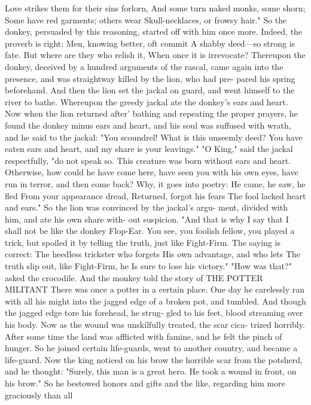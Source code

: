 \documentclass{book}
\begin{document}
Love strikes them for their sins forlorn,
And some turn naked monks, some shorn;
Some have red garments; others wear
Skull-necklaces, or frowsy hair."
So the donkey, persuaded by this reasoning,
started off with him once more. Indeed, the proverb
is right:
Men, knowing better, oft commit
A shabby deed---so strong is fate.
But where are they who relish it,
When once it is irrevocate?
Thereupon the donkey, deceived by a hundred
arguments of the rascal, came again into the presence,
and was straightway killed by the lion, who had pre-
pared his spring beforehand. And then the lion set
the jackal on guard, and went himself to the river to
bathe. Whereupon the greedy jackal ate the donkey's
ears and heart. Now when the lion returned after'
bathing and repeating the proper prayers, he found
the donkey minus ears and heart, and his soul was
suffused with wrath, and he said to the jackal: "You
scoundrel! What is this unseemly deed? You have
eaten ears and heart, and my share is your leavings."
"O King," said the jackal respectfully, "do not
speak so. This creature was born without ears and
heart. Otherwise, how could he have come here, have
seen you with his own eyes, have run in terror, and
then come back? Why, it goes into poetry:
He came, he saw, he fled
From your appearance dread,
Returned, forgot his fears
The fool lacked heart and ears."
So the lion was convinced by the jackal's argu-
ment, divided with him, and ate his own share with-
out suspicion.
"And that is why I say that I shall not be like the
donkey Flop-Ear. You see, you foolish fellow, you
played a trick, but spoiled it by telling the truth,
just like Fight-Firm. The saying is correct:
The heedless trickster who forgets
His own advantage, and who lets
The truth slip out, like Fight-Firm, he
Is sure to lose his victory."
"How was that?" asked the crocodile. And the
monkey told the story of
THE POTTER MILITANT
There was once a potter in a certain place. One
day he carelessly ran with all his might into the
jagged edge of a broken pot, and tumbled. And
though the jagged edge tore his forehead, he strug-
gled to his feet, blood streaming over his body. Now
as the wound was unskilfully treated, the scar cica-
trized horribly.
After some time the land was afflicted with famine,
and he felt the pinch of hunger. So he joined certain
life-guards, went to another country, and became a
life-guard.
Now the king noticed on his brow the horrible
scar from the potsherd, and he thought: "Surely,
this man is a great hero. He took a wound in front,
on his brow." So he bestowed honors and gifts and
the like, regarding him more graciously than all
\end{document}
